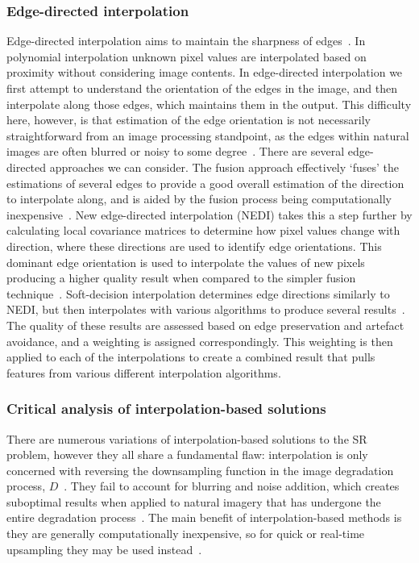 \subsubsection{Edge-directed interpolation}
Edge-directed interpolation aims to maintain the sharpness of edges~\cite{interpolation}. In polynomial interpolation unknown pixel values are interpolated based on proximity without considering image contents. In edge-directed interpolation we first attempt to understand the orientation of the edges in the image, and then interpolate along those edges, which maintains them in the output. This difficulty here, however, is that estimation of the edge orientation is not necessarily straightforward from an image processing standpoint, as the edges within natural images are often blurred or noisy to some degree~\cite{interpolation}. There are several edge-directed approaches we can consider. The fusion approach effectively `fuses' the estimations of several edges to provide a good overall estimation of the direction to interpolate along, and is aided by the fusion process being computationally inexpensive~\cite{interpolation}. New edge-directed interpolation (NEDI) takes this a step further by calculating local covariance matrices to determine how pixel values change with direction, where these directions are used to identify edge orientations. This dominant edge orientation is used to interpolate the values of new pixels producing a higher quality result when compared to the simpler fusion technique~\cite{interpolation}. Soft-decision interpolation determines edge directions similarly to NEDI, but then interpolates with various algorithms to produce several results~\cite{interpolation}. The quality of these results are assessed based on edge preservation and artefact avoidance, and a weighting is assigned correspondingly. This weighting is then applied to each of the interpolations to create a combined result that pulls features from various different interpolation algorithms.

\subsubsection{Critical analysis of interpolation-based solutions}
There are numerous variations of interpolation-based solutions to the SR problem, however they all share a fundamental flaw: interpolation is only concerned with reversing the downsampling function in the image degradation process, $D$~\cite{interpolation}. They fail to account for blurring and noise addition, which creates suboptimal results when applied to natural imagery that has undergone the entire degradation process~\cite{interpolation}. The main benefit of interpolation-based methods is they are generally computationally inexpensive, so for quick or real-time upsampling they may be used instead~\cite{interpolation}.

